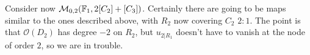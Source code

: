 Consider now $\mathcal{M}_{0,2}(\mathbb F_1,2[C_2]+[C_3])$. Certainly there are going to be maps similar to the ones described above, with $R_2$ now covering $C_2$ $2\colon 1$. The point is that $\mathcal O(D_2)$ has degree $-2$ on $R_2$, but $u_{2|R_1}$ doesn't have to vanish at the node of order $2$, so we are in trouble. 
\begin{comment}

\textcolor{blue}{Something is going on here: in this case there is a boundary component where the map is of the type that we have just described, and the requirement that $u_{2|R_1}$ vanishes of order $2$ at the node defines precisely the intersection with the main component. Check this. Could we possibly exploit this phenomenon to define a smaller compactification, possibly even smaller than quasimaps?} 

\end{comment}